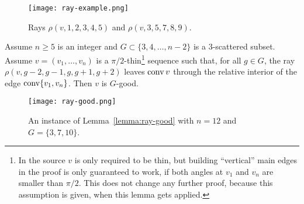 \begin{figure}[ht]
  \centering
  \texttt{[image: ray-example.png]}
  \caption{Rays $\rho(v,1,2,3,4,5)$ and $\rho(v,3,5,7,8,9)$. \cite[Figure 5]{shitov2020sublinear}}
  \label{fig:ray-example}
\end{figure}

\begin{lemma}\label{lemma:ray-good}
  Assume $n\geq 5$ is an integer and $G\subset\{3,4,\dots,n-2\}$ is a $3$-scattered subset. Assume $v=(v_1,\dots,v_n)$ is a $\pi/2$-thin\footnote{In the source $v$ is only required to be thin, but building ``vertical'' main edges in the proof is only guaranteed to work, if both angles at $v_1$ and $v_n$ are smaller than $\pi/2$. This does not change any further proof, because this assumption is given, when this lemma gets applied.} sequence such that, for all $g\in G$, the ray $\rho(v, g-2,g-1,g,g+1,g+2)$ leaves $\operatorname{conv} v$ through the relative interior of the edge $\operatorname{conv}\{v_1, v_n\}$. Then $v$ is $G$-good.
\end{lemma}

\begin{figure}[ht]
  \centering
  \texttt{[image: ray-good.png]}
  \caption{An instance of Lemma~\ref{lemma:ray-good} with $n=12$ and $G=\{3,7,10\}$. \cite[Figure 7]{shitov2020sublinear}}
  \label{fig:ray-good}
\end{figure}

